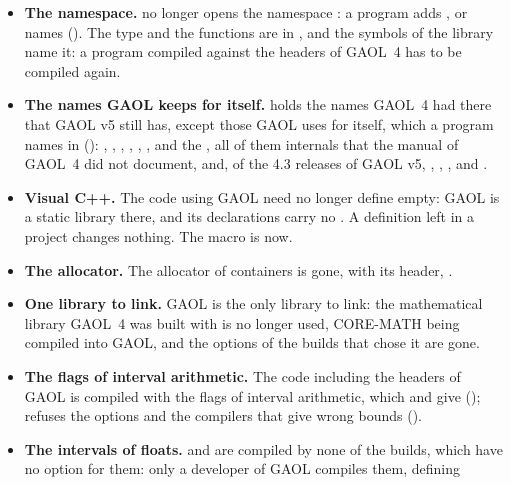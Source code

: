 \begin{itemize}
\item[$\bullet$] \textbf{The namespace.}  no longer opens
  the namespace : a program adds , or
  names  (). The type and the
  functions are in , and the symbols of the library name it:
  a program compiled against the headers of GAOL~4 has to be compiled again.
\item[$\bullet$] \textbf{The names GAOL keeps for itself.}  holds
  the names GAOL~4 had there that GAOL v5 still has, except those GAOL uses
  for itself, which a program names in 
  (): , ,
  , , ,
  ,  and the , all of
  them internals that the manual of GAOL~4 did not document, and, of the 4.3
  releases of GAOL v5,
  , , ,
   and .
\item[$\bullet$] \textbf{Visual C++.} The code using GAOL need no longer define
   empty: GAOL is a static library there, and its
  declarations carry no . A definition left in
  a project changes nothing. The macro is  now.
\item[$\bullet$] \textbf{The allocator.} The allocator of containers
   is gone, with its header,
  .
\item[$\bullet$] \textbf{One library to link.} GAOL is the only library to
  link: the mathematical library GAOL~4 was built with is no longer used,
  CORE-MATH being compiled into GAOL, and the options of the builds that chose
  it are gone.
\item[$\bullet$] \textbf{The flags of interval arithmetic.} The code
  including the headers of GAOL is compiled with the flags of interval
  arithmetic, which  and  give
  ();  refuses the options and
  the compilers that give wrong bounds ().
\item[$\bullet$] \textbf{The intervals of floats.}  and
   are compiled by none of the builds, which have no
  option for them: only a developer of GAOL compiles them, defining

\end{itemize}
